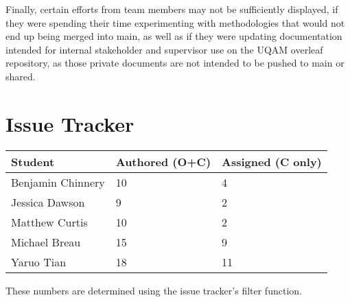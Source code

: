 \documentclass{article}
\begin{document}
Finally, certain efforts from team members may not be sufficiently displayed, if they were spending their time experimenting with methodologies that would not end up being merged into main, as well as if they were updating documentation intended for internal stakeholder and supervisor use on the UQAM overleaf repository, as those private documents are not intended to be pushed to main or shared.



\section{Issue Tracker}

\begin{table}[H]
\centering
\begin{tabular}{lll}
\toprule
\textbf{Student} & \textbf{Authored (O+C)} & \textbf{Assigned (C only)}\\
\midrule
Benjamin Chinnery & 10 & 4 \\
Jessica Dawson& 9 & 2 \\
Matthew Curtis & 10 & 2 \\
Michael Breau & 15 & 9 \\
Yaruo Tian & 18 & 11 \\
\bottomrule
\end{tabular}
\end{table}

These numbers are determined using the issue tracker's filter function.
\end{document}
